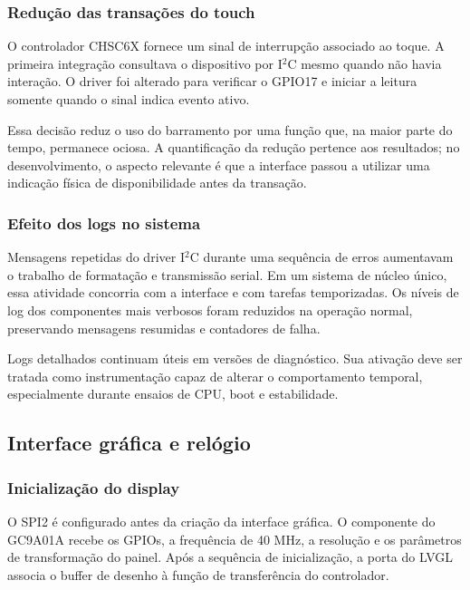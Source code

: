 \documentclass[a4paper,12pt]{article}
\begin{document}
\subsubsection{Redu\c{c}\~ao das transa\c{c}\~oes do touch}


O controlador CHSC6X fornece um sinal de interrup\c{c}\~ao associado ao toque. A primeira integra\c{c}\~ao consultava o dispositivo por I$^2$C mesmo quando n\~ao havia intera\c{c}\~ao. O driver foi alterado para verificar o GPIO17 e iniciar a leitura somente quando o sinal indica evento ativo.


Essa decis\~ao reduz o uso do barramento por uma fun\c{c}\~ao que, na maior parte do tempo, permanece ociosa. A quantifica\c{c}\~ao da redu\c{c}\~ao pertence aos resultados; no desenvolvimento, o aspecto relevante \'e que a interface passou a utilizar uma indica\c{c}\~ao f\'isica de disponibilidade antes da transa\c{c}\~ao.


\subsubsection{Efeito dos logs no sistema}


Mensagens repetidas do driver I$^2$C durante uma sequ\^encia de erros aumentavam o trabalho de formata\c{c}\~ao e transmiss\~ao serial. Em um sistema de n\'ucleo \'unico, essa atividade concorria com a interface e com tarefas temporizadas. Os n\'iveis de log dos componentes mais verbosos foram reduzidos na opera\c{c}\~ao normal, preservando mensagens resumidas e contadores de falha.


Logs detalhados continuam \'uteis em vers\~oes de diagn\'ostico. Sua ativa\c{c}\~ao deve ser tratada como instrumenta\c{c}\~ao capaz de alterar o comportamento temporal, especialmente durante ensaios de CPU, boot e estabilidade.


\subsection{Interface gr\'afica e rel\'ogio}


\subsubsection{Inicializa\c{c}\~ao do display}


O SPI2 \'e configurado antes da cria\c{c}\~ao da interface gr\'afica. O componente do GC9A01A recebe os GPIOs, a frequ\^encia de 40 MHz, a resolu\c{c}\~ao e os par\^ametros de transforma\c{c}\~ao do painel. Ap\'os a sequ\^encia de inicializa\c{c}\~ao, a porta do LVGL associa o buffer de desenho \`a fun\c{c}\~ao de transfer\^encia do controlador.
\end{document}
